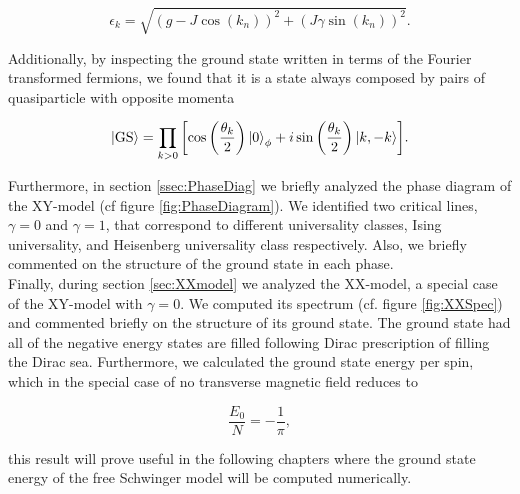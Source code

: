\begin{equation*}
	\epsilon_k =  \sqrt{(g- J\cos(k_n))^2 + (J\gamma \sin(k_n))^2}.
\end{equation*}

Additionally, by inspecting the ground state written in terms of the Fourier transformed fermions, we found that it is a state always composed by pairs of quasiparticle with opposite momenta

\begin{equation*}
	\ket{\rm{GS}} = \prod_{k>0} \qty[\cos\qty(\frac{\theta_k}{2})\ket 0_\phi+ i\sin\qty(\frac{\theta_k}{2})\ket{k,-k}].
\end{equation*}

Furthermore, in section \ref{ssec:PhaseDiag} we briefly analyzed the phase diagram of the XY-model (cf figure \ref{fig:PhaseDiagram}). We identified two critical lines, $\gamma=0$ and $\gamma=1$, that correspond to different universality classes, Ising universality, and Heisenberg universality class respectively. Also, we briefly commented on the structure of the ground state in each phase.\\

Finally, during section \ref{sec:XXmodel} we analyzed the XX-model, a special case of the XY-model with $\gamma=0$. We computed its spectrum (cf. figure \ref{fig:XXSpec}) and commented briefly on the structure of its ground state. The ground state had all of the negative energy states are filled following Dirac prescription of filling the Dirac sea. Furthermore, we calculated the ground state energy per spin, which in the special case of no transverse magnetic field reduces to 

\begin{equation*}
	\frac{E_0}{N} = -\frac{1}{\pi},
\end{equation*}

this result will prove useful in the following chapters where the ground state energy of the free Schwinger model will be computed numerically.